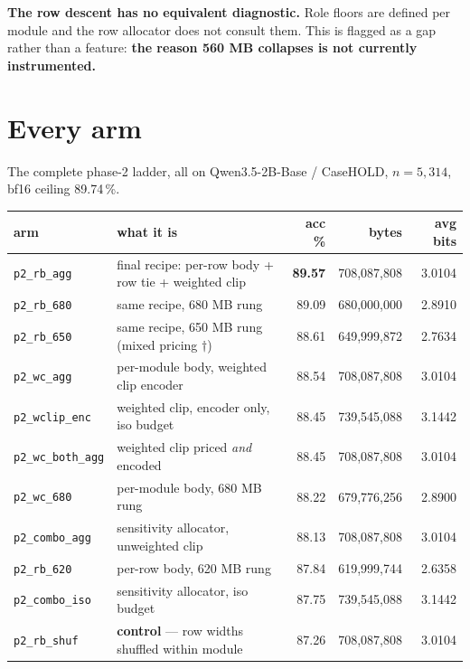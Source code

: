 \documentclass[11pt]{article}
\newcommand{\pct}{\,\%}
\newcommand{\code}[1]{\texttt{#1}}
\newcommand{\best}[1]{\textbf{#1}}
\newenvironment{aside}%
{\par\needspace{4\baselineskip}\vspace{0.8ex}%
\begin{lrbox}{\asidebox}\begin{minipage}{\dimexpr\textwidth-18pt\relax}\small}%
{\end{minipage}\end{lrbox}%
\noindent\setlength{\fboxsep}{9pt}\colorbox{warnbg}{\usebox{\asidebox}}%
\vspace{0.6ex}\par}
\begin{document}
\begin{aside}
\textbf{The row descent has no equivalent diagnostic.} Role floors are defined per module and the
row allocator does not consult them. This is flagged as a gap rather than a feature: \textbf{the
reason 560 MB collapses is not currently instrumented.}
\end{aside}

\section{Every arm}

The complete phase-2 ladder, all on Qwen3.5-2B-Base / CaseHOLD, $n = 5{,}314$, bf16 ceiling
89.74\pct.

\begin{center}\footnotesize
\begin{tabular}{@{}llrrr@{}}
\toprule
arm & what it is & acc \% & bytes & avg bits \\
\midrule
\rowcolor{winbg}
\code{p2\_rb\_agg} & final recipe: per-row body + row tie + weighted clip & \best{89.57} & 708{,}087{,}808 & 3.0104 \\
\code{p2\_rb\_680} & same recipe, 680 MB rung & 89.09 & 680{,}000{,}000 & 2.8910 \\
\code{p2\_rb\_650} & same recipe, 650 MB rung (mixed pricing $\dagger$) & 88.61 & 649{,}999{,}872 & 2.7634 \\
\code{p2\_wc\_agg} & per-module body, weighted clip encoder & 88.54 & 708{,}087{,}808 & 3.0104 \\
\code{p2\_wclip\_enc} & weighted clip, encoder only, iso budget & 88.45 & 739{,}545{,}088 & 3.1442 \\
\code{p2\_wc\_both\_agg} & weighted clip priced \emph{and} encoded & 88.45 & 708{,}087{,}808 & 3.0104 \\
\code{p2\_wc\_680} & per-module body, 680 MB rung & 88.22 & 679{,}776{,}256 & 2.8900 \\
\code{p2\_combo\_agg} & sensitivity allocator, unweighted clip & 88.13 & 708{,}087{,}808 & 3.0104 \\
\code{p2\_rb\_620} & per-row body, 620 MB rung & 87.84 & 619{,}999{,}744 & 2.6358 \\
\code{p2\_combo\_iso} & sensitivity allocator, iso budget & 87.75 & 739{,}545{,}088 & 3.1442 \\
\rowcolor{ctlbg}
\code{p2\_rb\_shuf} & \textbf{control} --- row widths shuffled within module & 87.26 & 708{,}087{,}808 & 3.0104 \\

\end{tabular}
\end{center}
\end{document}
